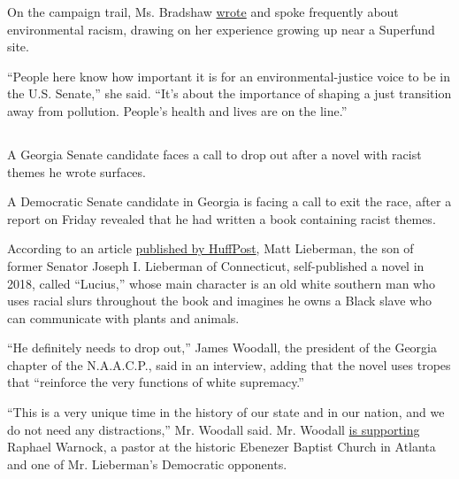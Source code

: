 On the campaign trail, Ms. Bradshaw
\href{https://www.sierraclub.org/tennessee/blog/2020/06/marquita-bradshaw-let-s-hold-space-dissonance}{wrote}
and spoke frequently about environmental racism, drawing on her
experience growing up near a Superfund site.

``People here know how important it is for an environmental-justice
voice to be in the U.S. Senate,'' she said. ``It's about the importance
of shaping a just transition away from pollution. People's health and
lives are on the line.''

\hypertarget{-9}{%
\subsection{}\label{-9}}

A Georgia Senate candidate faces a call to drop out after a novel with
racist themes he wrote surfaces.

A Democratic Senate candidate in Georgia is facing a call to exit the
race, after a report on Friday revealed that he had written a book
containing racist themes.

According to an article
\href{https://www.huffpost.com/entry/a-democratic-senate-candidate-wrote-a-book-filled-with-racist-tropes_n_5f2cd06ac5b6e96a22b03e3e?vdc\&guccounter=1\&guce_referrer=aHR0cHM6Ly90LmNvL0ZTY05URktDYXY_YW1wPTE\&guce_referrer_sig=AQAAAN25FsV52VhOSPdANYrQDwIapNplzxvmOd--teHPmFUOu7EEDyFD4NTVwuz8CgNoXgZQhaN7985GL5cKg9GZfEHg_-pjGzl-s6ne39c9Xe5i5pZGUAbHhvlNQ3HB2n_4UEK8EoUYMUplUl5CeeSL2cXLuEM0LvYLpwwFd2r2A5sy}{published
by HuffPost}, Matt Lieberman, the son of former Senator Joseph I.
Lieberman of Connecticut, self-published a novel in 2018, called
``Lucius,'' whose main character is an old white southern man who uses
racial slurs throughout the book and imagines he owns a Black slave who
can communicate with plants and animals.

``He definitely needs to drop out,'' James Woodall, the president of the
Georgia chapter of the N.A.A.C.P., said in an interview, adding that the
novel uses tropes that ``reinforce the very functions of white
supremacy.''

``This is a very unique time in the history of our state and in our
nation, and we do not need any distractions,'' Mr. Woodall said. Mr.
Woodall
\href{https://twitter.com/iMajorWish/status/1235969589147840513}{is
supporting} Raphael Warnock, a pastor at the historic Ebenezer Baptist
Church in Atlanta and one of Mr. Lieberman's Democratic opponents.

